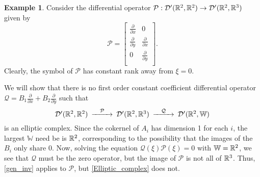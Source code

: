\documentclass{amsart}
\theoremstyle{definition}
\newtheorem{example}[theorem]{Example}
\numberwithin{equation}{section}
\begin{document}
\begin{example}
Consider the differential operator ${\mathcal{P}}: {\mathcal{D}}'(\Bbb R^2, \Bbb R^2) \to {\mathcal{D}}'(\Bbb R^2, \Bbb R^3)$ given by $${\mathcal{P}} = \left[ \begin{array}{cc} \frac{\partial} {\partial x} & 0 \\ \frac{\partial} {\partial y} & \frac{\partial} {\partial x} \\ 0 & \frac{\partial} {\partial y} \\ \end{array}\right].$$  Clearly, the symbol of ${\mathcal{P}}$ has constant rank away from $\xi=0$.  

We will show that there is no first order constant coefficient differential operator ${\mathcal{Q}} = B_1 \frac {\partial} {\partial x} + B_2 \frac {\partial} {\partial y}$ such that $$\begin{CD} {\mathcal{D}}'(\Bbb R^2, \Bbb R^2) @>{\mathcal{P}}>> {\mathcal{D}}'(\Bbb R^2, \Bbb R^3) @>{\mathcal{Q}}>> {\mathcal{D}}'(\Bbb R^2, {\mathbb{W}}) \end{CD}$$ is an elliptic complex.  Since the cokernel of $A_i$ has dimension 1 for each $i$, the largest ${\mathbb{W}}$ need be is $\Bbb R^2$, corresponding to the possibility that the images of the $B_i$ only share $0$.  Now, solving the equation ${\mathcal{Q}}(\xi) {\mathcal{P}}(\xi) =0$ with ${\mathbb{W}}=\Bbb R^2$, we see that ${\mathcal{Q}}$ must be the zero operator, but the image of ${\mathcal{P}}$ is not all of $\Bbb R^3$.  Thus, \autoref{gen_inv} applies to ${\mathcal{P}}$, but \autoref{Elliptic_complex} does not.
\end{example}



\end{document}
